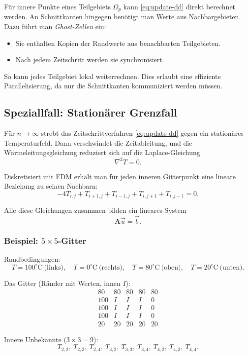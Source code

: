 Für innere Punkte eines Teilgebiets $\Omega_p$ kann \eqref{eq:update-dd} direkt berechnet werden.  
An Schnittkanten hingegen benötigt man Werte aus Nachbargebieten.  
Dazu führt man \emph{Ghost-Zellen} ein:
\begin{itemize}
	\item Sie enthalten Kopien der Randwerte aus benachbarten Teilgebieten.
	\item Nach jedem Zeitschritt werden sie synchronisiert.
\end{itemize}
So kann jedes Teilgebiet lokal weiterrechnen. Dies erlaubt eine effiziente Parallelisierung, da nur die Schnittkanten kommuniziert werden müssen.



\subsection{Speziallfall: Stationärer Grenzfall}
Für $n \to \infty$ strebt das Zeitschrittverfahren \eqref{eq:update-dd} gegen ein stationäres Temperaturfeld. 
Dann verschwindet die Zeitableitung, und die Wärmeleitungsgleichung reduziert sich auf die Laplace-Gleichung
\[
\nabla^2 T = 0.
\]

Diskretisiert mit FDM erhält man für jeden inneren Gitterpunkt eine lineare Beziehung zu seinen Nachbarn:
\[
-4T_{i,j} + T_{i+1,j} + T_{i-1,j} + T_{i,j+1} + T_{i,j-1} = 0.
\]

Alle diese Gleichungen zusammen bilden ein lineares System
\[
\mathbf{A}\vec{u} = \vec{b}.
\]

\subsubsection*{Beispiel: $5\times 5$-Gitter}
Randbedingungen:
\[
T=100^\circ\mathrm{C}\ \text{(links)},\quad
T=0^\circ\mathrm{C}\ \text{(rechts)},\quad
T=80^\circ\mathrm{C}\ \text{(oben)},\quad
T=20^\circ\mathrm{C}\ \text{(unten)}.
\]

Das Gitter (Ränder mit Werten, innen $I$):
\[
\begin{array}{ccccc}
	80 & 80 & 80 & 80 & 80 \\
	100 & I & I & I & 0 \\
	100 & I & I & I & 0 \\
	100 & I & I & I & 0 \\
	20 & 20 & 20 & 20 & 20
\end{array}
\]

Innere Unbekannte ($3\times 3 = 9$):
\[
T_{2,2},\ T_{2,3},\ T_{2,4},\ T_{3,2},\ T_{3,3},\ T_{3,4},\ T_{4,2},\ T_{4,3},\ T_{4,4}.
\]

